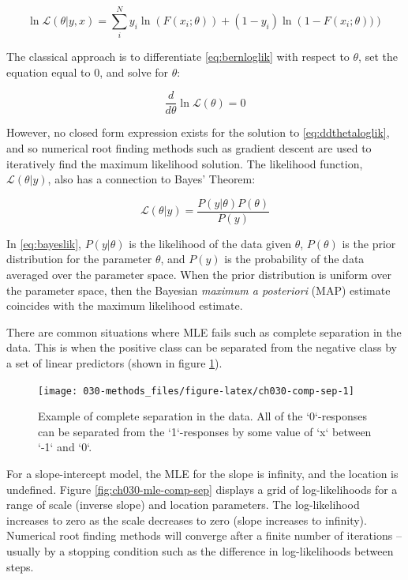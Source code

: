 \documentclass[11pt, oneside, openany]{scrbook}
\begin{document}
\begin{equation}
  \ln \mathcal{L}(\theta | y, x) = \sum_{i}^{N} y_i \ln\left(F(x_i;\theta)\right) + (1-y_i) \ln\left(1 - F(x_i;\theta))\right)
  \label{eq:bernloglik}
\end{equation}

The classical approach is to differentiate \eqref{eq:bernloglik} with respect to \(\theta\), set the equation equal to \(0\), and solve for \(\theta\):

\begin{equation}
  \frac{d}{d\theta} \ln \mathcal{L}(\theta) = 0
  \label{eq:ddthetaloglik}
\end{equation}

However, no closed form expression exists for the solution to \eqref{eq:ddthetaloglik}, and so numerical root finding methods such as gradient descent are used to iteratively find the maximum likelihood solution. The likelihood function, \(\mathcal{L}(\theta | y)\), also has a connection to Bayes' Theorem:

\begin{equation}
  \mathcal{L}(\theta | y) = \frac{P(y | \theta) P(\theta)}{P(y)}
  \label{eq:bayeslik}
\end{equation}

In \eqref{eq:bayeslik}, \(P(y | \theta)\) is the likelihood of the data given \(\theta\), \(P(\theta)\) is the prior distribution for the parameter \(\theta\), and \(P(y)\) is the probability of the data averaged over the parameter space. When the prior distribution is uniform over the parameter space, then the Bayesian \emph{maximum a posteriori} (MAP) estimate coincides with the maximum likelihood estimate.

There are common situations where MLE fails such as complete separation in the data. This is when the positive class can be separated from the negative class by a set of linear predictors (shown in figure \ref{fig:ch030-comp-sep}).

\begin{figure}

{\centering \texttt{[image: 030-methods\_files/figure-latex/ch030-comp-sep-1]} 

}

\caption{Example of complete separation in the data. All of the `0`-responses can be separated from the `1`-responses by some value of `x` between `-1` and `0`.}\label{fig:ch030-comp-sep}
\end{figure}

For a slope-intercept model, the MLE for the slope is infinity, and the location is undefined. Figure \ref{fig:ch030-mle-comp-sep} displays a grid of log-likelihoods for a range of scale (inverse slope) and location parameters. The log-likelihood increases to zero as the scale decreases to zero (slope increases to infinity). Numerical root finding methods will converge after a finite number of iterations -- usually by a stopping condition such as the difference in log-likelihoods between steps.
\end{document}
